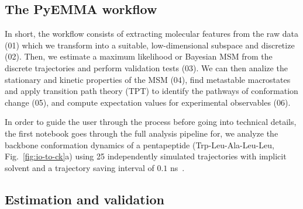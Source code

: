 \documentclass[9pt,tutorial]{livecoms}
\begin{document}
\subsection{The PyEMMA workflow}

In short, the workflow consists of extracting molecular features from the raw data (01) which we transform into a suitable, low-dimensional subspace and discretize (02).
Then, we estimate a maximum likelihood or Bayesian MSM from the discrete trajectories and perform validation tests (03).
We can then analize the stationary and kinetic properties of the MSM (04),
find metastable macrostates and apply transition path theory (TPT) to identify the pathways of conformation change (05),
and compute expectation values for experimental observables (06).

In order to guide the user through the process before going into technical details,
the first notebook goes through the full analysis pipeline for,
we analyze the backbone conformation dynamics of a pentapeptide (Trp-Leu-Ala-Leu-Leu, Fig.~\ref{fig:io-to-ck}a) using 25 independently simulated trajectories with implicit solvent and a trajectory saving interval of $0.1$ ns~\cite{pyemma}.

\subsection{Estimation and validation}
\end{document}
